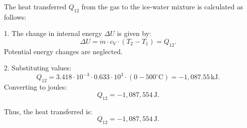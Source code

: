 The heat transferred \( Q_{12} \) from the gas to the ice-water mixture is calculated as follows:  

1. The change in internal energy \( \Delta U \) is given by:  
\[
\Delta U = \dot{m} \cdot c_V \cdot (T_2 - T_1) = Q_{12}.
\]  
Potential energy changes are neglected.  

2. Substituting values:  
\[
Q_{12} = 3.418 \cdot 10^{-3} \cdot 0.633 \cdot 10^3 \cdot (0 - 500^\circ\text{C}) = -1,087.55 \, \text{kJ}.
\]  
Converting to joules:  
\[
Q_{12} = -1,087,554 \, \text{J}.
\]  

Thus, the heat transferred is:  
\[
Q_{12} = -1,087,554 \, \text{J}.
\]